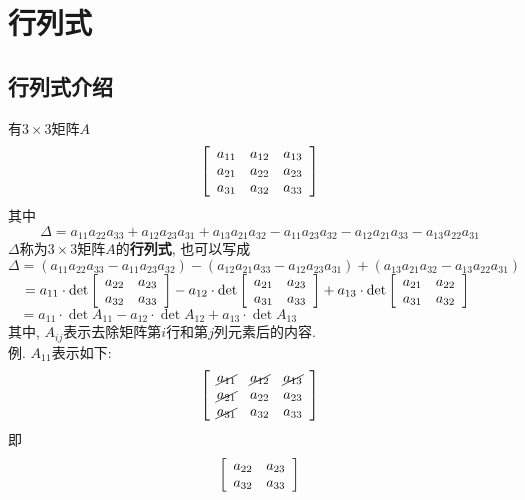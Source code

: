 \chapter{行列式}
\section{行列式介绍}
有$3\times 3$矩阵$A$
\[\left[\begin{array}{l l l}
a_{11} & a_{12} & a_{13}\\
a_{21} & a_{22} & a_{23}\\
a_{31} & a_{32} & a_{33}
\end{array}\right]\]
其中
\[\Delta=a_{11}a_{22}a_{33}+a_{12}a_{23}a_{31}+a_{13}a_{21}a_{32}-a_{11}a_{23}a_{32}-a_{12}a_{21}a_{33}-a_{13}a_{22}a_{31}\]
$\Delta$称为$3\times 3$矩阵$A$的\textbf{行列式}, 也可以写成\\
$\Delta=(a_{11}a_{22}a_{33}-a_{11}a_{23}a_{32})-(a_{12}a_{21}a_{33}-a_{12}a_{23}a_{31})+(a_{13}a_{21}a_{32}-a_{13}a_{22}a_{31})$\\[1ex]
$\phantom{\Delta}=a_{11}\cdot\det\left[\begin{array}{l l}
a_{22} & a_{23}\\
a_{32} & a_{33}
\end{array}\right]-a_{12}\cdot\det\left[\begin{array}{l l}
a_{21} & a_{23}\\
a_{31} & a_{33}
\end{array}\right]+a_{13}\cdot\det\left[\begin{array}{l l}
a_{21} & a_{22}\\
a_{31} & a_{32}
\end{array}\right]$\\[1ex]
$\phantom{\Delta}=a_{11}\cdot\det A_{11}-a_{12}\cdot\det A_{12}+a_{13}\cdot\det A_{13}$\\
其中, $A_{ij}$表示去除矩阵第$i$行和第$j$列元素后的内容.\\
例. $A_{11}$表示如下:\\
\[\left[\begin{array}{l l l}
\cancel{a_{11}} & \cancel{a_{12}} & \cancel{a_{13}}\\
\cancel{a_{21}} & a_{22} & a_{23}\\
\cancel{a_{31}} & a_{32} & a_{33}
\end{array}\right]\]
即
\[\left[\begin{array}{l l}
a_{22} & a_{23}\\
a_{32} & a_{33}
\end{array}\right]\]\\[2ex]

